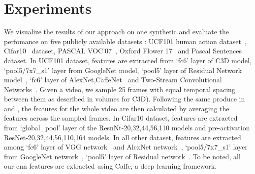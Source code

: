 \documentclass[letterpaper]{article}
\def\bL{{\bf L}}
\def\yanred{\textcolor{red}}
\begin{document}

\section{Experiments}
We visualize the results of our approach on one synthetic and evaluate the perfomance on five publicly available datasets : UCF101 human action dataset~\cite{soomro2012ucf101}, Cifar10~\cite{krizhevsky2009learning} dataset, PASCAL VOC’07~\cite{pascal-voc-2007}, Oxford Flower 17~\cite{nilsback2006visual} and Pascal Sentences dataset.
In UCF101 dataset, features are extracted from `fc6' layer of C3D model\cite{tran2015learning}, `pool5/7x7\_s1' layer from GoogleNet model\cite{szegedy2015going}, `pool5' layer of Residual Network model~\cite{he2015deep}, `fc6' layer of AlexNet,CaffeNet~\cite{krizhevsky2012imagenet} and Two-Stream Convolutional Networks~\cite{simonyan2014two}. Given a video, we sample 25 frames with equal temporal spacing between them as described in \cite{simonyan2014two} volumes for C3D). Following the same produce in \cite{tran2015learning} and \cite{simonyan2014two}, the features for the whole video are then calculated by averaging the features across the sampled frames.
In Cifar10 dataset, features are extracted from `global\_pool' layer of the ResnNt-20,32,44,56,110 models\cite{he2015deep} and pre-activation ResNet-20,32,44,56,110,164 models\cite{he2016identity}.
In all other dataset, features are extracted among `fc6' layer of VGG network~\cite{chatfield2014return} and AlexNet network~\cite{krizhevsky2012imagenet}, `pool5/7x7\_s1' layer from GoogleNet network~\cite{szegedy2015going}, `pool5' layer of Residual network~\cite{he2015deep}.
To be noted, all our cnn features are extracted using Caffe\cite{jia2014caffe}, a deep learning framework.
\end{document}
